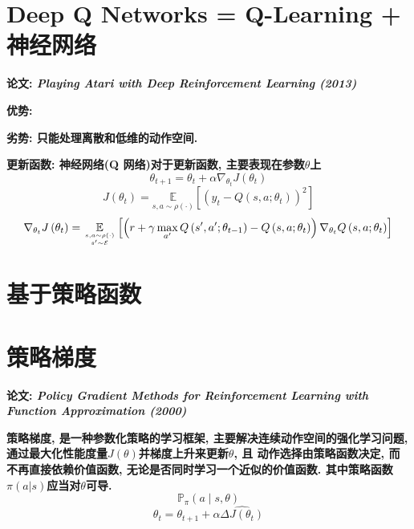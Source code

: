     	\section{Deep Q Networks = Q-Learning + 神经网络}
            \bf{论文}: \textit{Playing Atari with Deep Reinforcement Learning (2013)}
        
            \bf{优势}:

            \bf{劣势}: 只能处理离散和低维的动作空间.
        
            \bf{更新函数}: 神经网络(Q 网络)对于更新函数, 主要表现在参数$\theta$上
                $$\theta_{t+1} = \theta_{t} + \alpha \nabla_{\theta_{t}} J\left(\theta_{t}\right)$$
                $$J\left(\theta_{t}\right)=\underset{s, a \sim \rho(\cdot)}{\mathbb{E}} \left[\left(y_{t}-Q\left(s, a ; \theta_{t}\right)\right)^{2}\right]$$
                $$\nabla_{\theta_{t}} J\left(\theta_{t}\right)=\underset{s, a \sim \rho(\cdot) \atop s^{\prime} \sim \mathcal{E}}{\mathbb{E}}\left[\left(r+\gamma \max _{a^{\prime}} Q\left(s^{\prime}, a^{\prime} ; \theta_{t-1}\right)-Q\left(s, a ; \theta_{t}\right)\right) \nabla_{\theta_{t}} Q\left(s, a ; \theta_{t}\right)\right]$$


\section{基于策略函数}

    \section{策略梯度}
        \bf{论文}: \textit{Policy Gradient Methods for Reinforcement Learning with Function Approximation (2000)}

        \bf{策略梯度}, 是一种参数化策略的学习框架, 主要解决连续动作空间的强化学习问题,  通过最大化性能度量$J(\theta)$并梯度上升来更新$\theta$, 且 动作选择由策略函数决定, 而不再直接依赖价值函数, 无论是否同时学习一个近似的价值函数. 其中策略函数$\pi(a|s)$应当对$\theta$可导.
            $$\mathbb{P}_\pi (a \mid s, \theta)$$
            $$ \theta_t = \theta_{t+1} + \alpha  \widehat{\Delta J(\theta_t)}$$
        

